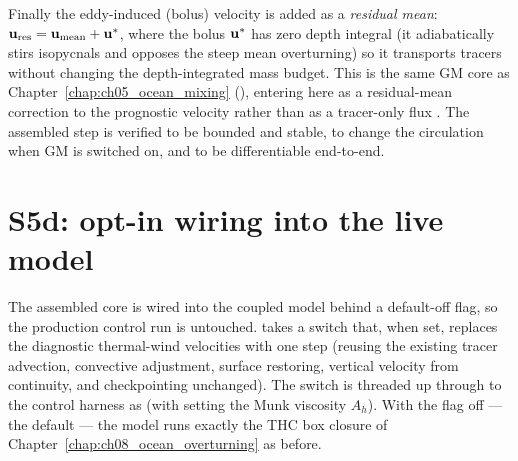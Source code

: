 Finally the \citet{gentmcwilliams1990} eddy-induced (bolus) velocity is added as a
\emph{residual mean}: $\mathbf{u}_{\mathrm{res}}=\mathbf{u}_{\mathrm{mean}}+\mathbf{u}^{*}$, where the bolus
$\mathbf{u}^{*}$ has zero depth integral (it adiabatically stirs isopycnals and opposes the steep mean
overturning) so it transports tracers without changing the depth-integrated mass budget. This is
the same GM core as Chapter~\ref{chap:ch05_ocean_mixing} (), entering here as a
residual-mean correction to the prognostic velocity rather than as a tracer-only flux
\citep{gentmcwilliams1990,griffies2004}. The assembled step is verified to be bounded and stable,
to change the circulation when GM is switched on, and to be differentiable end-to-end.

\section{S5d: opt-in wiring into the live model}\label{sec:s5d}

The assembled core is wired into the coupled model behind a default-off flag, so the production
control run is untouched.  takes a 
switch that, when set, replaces the diagnostic thermal-wind velocities with one
 step (reusing the existing tracer advection, convective
adjustment, surface restoring, vertical velocity from continuity, and checkpointing unchanged).
The switch is threaded up through  to the control harness as
 (with  setting the Munk
viscosity $A_h$). With the flag off --- the default --- the model runs exactly the THC box closure
of Chapter~\ref{chap:ch08_ocean_overturning} as before.

